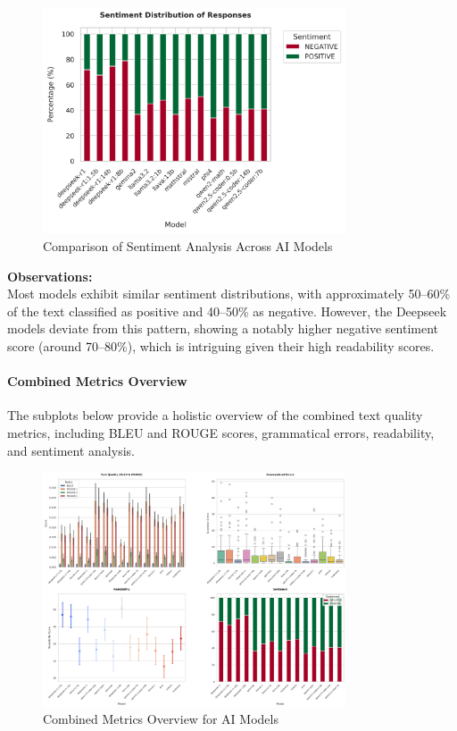 \begin{figure}[H]
  \centering
  \includegraphics[width=0.8\textwidth]{figures/scores/sentiment.png}
  \caption{Comparison of Sentiment Analysis Across AI Models}
  \label{fig:sentiment}
\end{figure}

\textbf{Observations:} \\
Most models exhibit similar sentiment distributions, with approximately 50–60\% of the text classified as positive and 40–50\% as negative. However, the Deepseek models deviate from this pattern, showing a notably higher negative sentiment score (around 70–80\%), which is intriguing given their high readability scores.

\paragraph{Combined Metrics Overview}

The subplots below provide a holistic overview of the combined text quality metrics, including BLEU and ROUGE scores, grammatical errors, readability, and sentiment analysis.

\begin{figure}[H]
  \centering
  \includegraphics[width=0.8\textwidth]{figures/scores/combined_metrics.png}
  \caption{Combined Metrics Overview for AI Models}
  \label{fig:combined_metrics}
\end{figure}

